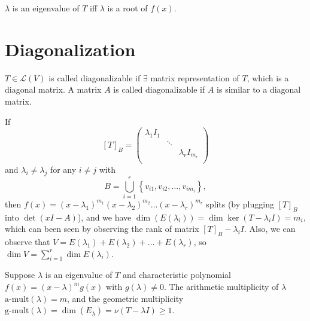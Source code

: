 \begin{theorem}
    \(\lambda \) is an eigenvalue of \(T\) iff \(\lambda \) is a root of \(f(x)\).      
\end{theorem}

\section{Diagonalization}

\begin{definition}
    \(T \in \mathcal{L} (V)\) is called diagonalizable if \(\exists \) matrix representation of \(T\), which is a diagonal matrix. A matrix \(A\) is called diagonalizable if \(A\) is similar to a diagonal matrix.  
\end{definition}

If 
\[
    [T]_B = \begin{pmatrix}
        \lambda _1 I_1 &  &   \\
         & \ddots &   \\
         &  & \lambda _r I_{m_r}  \\
    \end{pmatrix}
\] and \(\lambda _i \neq \lambda _j\) for any \(i \neq j\) with 
\[
    B = \bigcup_{i=1}^{r} \left\{ v_{i1}, v_{i2}, \dots , v_{i m_i} \right\},  
\] then \(f(x) = (x - \lambda _1)^{m_1} (x - \lambda _2)^{m_2} \dots (x - \lambda _r)^{m_r}\) splits (by plugging \([T]_B\) into \(\det (xI - A)\)), and we have \(\dim (E(\lambda _i)) = \dim \ker (T - \lambda _i I) = m_i\), which can been seen by observing the rank of matrix \([T]_B - \lambda _i I\). Also, we can observe that \(V = E(\lambda _1) + E(\lambda _2) + \dots + E(\lambda _r)\), so \(\dim V = \sum_{i=1}^r \dim E(\lambda _i) \).

\begin{definition}
    Suppose \(\lambda \) is an eigenvalue of \(T\) and characteristic polynomial \(f(x) = (x - \lambda )^m g(x)\) with \(g(\lambda ) \neq 0\). The arithmetic multiplicity of \(\lambda \) \(\text{a-mult}(\lambda ) = m\), and the geometric multiplicity \(\text{g-mult}(\lambda ) = \dim (E_\lambda ) = \nu (T - \lambda I) \ge 1 \).      
\end{definition}

